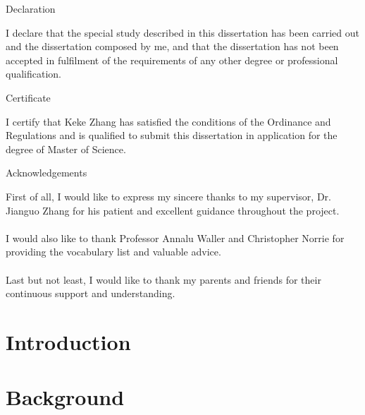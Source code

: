 \documentclass[12pt,a4paper]{report}
\begin{document}
\begin{center}
{\huge Declaration}
\end{center}
I declare that the special study described in this dissertation has been carried out and the dissertation composed by me, and that the dissertation has not been accepted in fulfilment of the requirements of any other degree or professional qualification.
\newpage


\begin{center}
{\huge Certificate}
\end{center}
I certify that Keke Zhang has satisfied the conditions of the Ordinance and Regulations and is qualified to submit this dissertation in application for the degree of Master of Science.
\newpage

\begin{center}
{\huge Acknowledgements}
\end{center}
First of all, I would like to express my sincere thanks to my supervisor, Dr. Jianguo Zhang for his patient and excellent guidance throughout the project.\\
\\
I would also like to thank Professor Annalu Waller and Christopher Norrie for providing the vocabulary list and valuable advice.\\
\\
Last but not least, I would like to thank my parents and friends for their continuous support and understanding.


\newpage
{}
\section{Introduction}
\section{Background}
\end{document}
